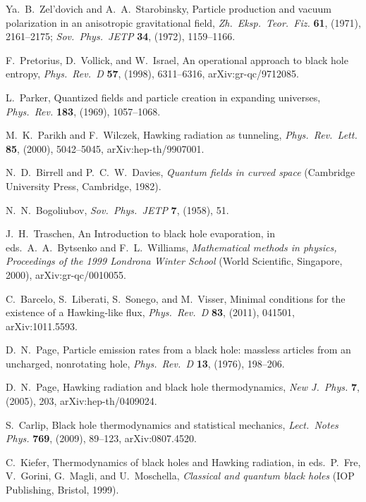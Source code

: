 \documentclass[11pt]{article}
\begin{document}
\begin{thebibliography}{999}
 Ya.~B.\ Zel'dovich and A.~A.\ Starobinsky, 
Particle production and vacuum polarization in an anisotropic 
gravitational field, \emph{Zh.\ Eksp.\ Teor.\ Fiz.} {\bf 61}, 
(1971), 2161--2175; \emph{Sov.\ Phys.\ JETP} {\bf 34}, 
(1972), 1159--1166.

 F.\ Pretorius, D.\ Vollick, and W.\ Israel,
An operational approach to black hole entropy, \emph{Phys.\
Rev.\ D} {\bf 57}, (1998), 6311--6316, arXiv:gr-qc/9712085.

 L.\ Parker, Quantized fields and particle 
creation in expanding universes, \emph{Phys.\ Rev.} {\bf 183}, 
(1969), 1057--1068.

 M.~K.\ Parikh and F.\ Wilczek, Hawking 
radiation as tunneling, \emph{Phys.\ Rev.\ Lett.} {\bf 85}, 
(2000), 5042--5045, arXiv:hep-th/9907001.

  N.~D.\ Birrell and P.~C.~W.\ Davies,
\emph{Quantum fields in curved space} (Cambridge University
Press, Cambridge, 1982).

 N.~N.\ Bogoliubov, 
\emph{Sov.\ Phys.\ JETP} {\bf 7}, (1958), 51.

 J.~H.\ Traschen, An Introduction to black hole 
evaporation, in eds.\ A.~A.\ Bytsenko and F.~L.\ Williams, 
\emph{Mathematical methods in physics, Proceedings of the 1999 
Londrona Winter School}  (World Scientific, Singapore, 2000), 
arXiv:gr-qc/0010055.

 C.\ Barcelo, S.\ Liberati, S.\ Sonego, and M.\ Visser,
Minimal conditions for the existence of a Hawking-like flux,
\emph{Phys.\ Rev.\ D} {\bf 83}, (2011), 041501, arXiv:1011.5593.

 D.~N.\ Page, Particle emission rates from a 
black hole: massless articles from an uncharged, nonrotating 
hole, \emph{Phys.\ Rev.\ D} {\bf 13}, (1976), 198--206.

 D.~N.\ Page, Hawking radiation and black hole 
thermodynamics, \emph{New J.\ Phys.} {\bf 7}, (2005),
203, arXiv:hep-th/0409024.

 S.\ Carlip, Black hole thermodynamics and 
statistical mechanics, \emph{Lect.\ Notes Phys.} {\bf 769},
 (2009), 89--123,  arXiv:0807.4520.

 C.\ Kiefer, Thermodynamics of black holes and 
Hawking radiation, in eds.\ P.\ Fre, V.\ Gorini, G.\ Magli, and 
U.\ Moschella, \emph{Classical and quantum black holes}
(IOP Publishing, Bristol, 1999).


\end{thebibliography}
\end{document}
